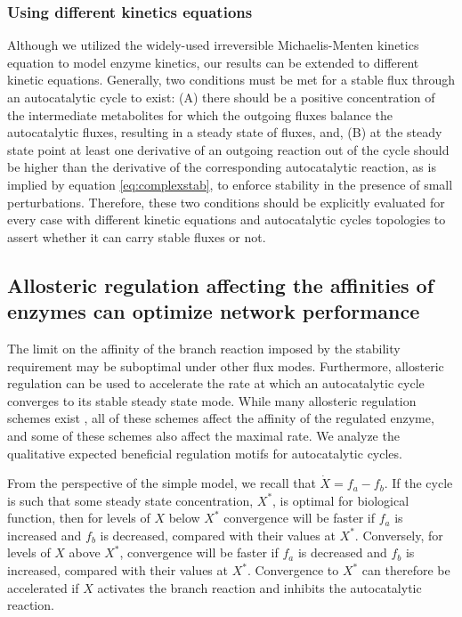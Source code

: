     \subsubsection{Using different kinetics equations}
    Although we utilized the widely-used irreversible Michaelis-Menten kinetics equation to model enzyme kinetics, our results can be extended to different kinetic equations.
    Generally, two conditions must be met for a stable flux through an autocatalytic cycle to exist: (A) there should be a positive concentration of the intermediate metabolites for which the outgoing fluxes balance the autocatalytic fluxes, resulting in a steady state of fluxes, and, (B) at the steady state point at least one derivative of an outgoing reaction out of the cycle should be higher than the derivative of the corresponding autocatalytic reaction, as is implied by equation \ref{eq:complexstab}, to enforce stability in the presence of small perturbations.
    Therefore, these two conditions should be explicitly evaluated for every case with different kinetic equations and autocatalytic cycles topologies to assert whether it can carry stable fluxes or not.


    \subsection{Allosteric regulation affecting the affinities of enzymes can optimize network performance}
    The limit on the affinity of the branch reaction imposed by the stability requirement may be suboptimal under other flux modes.
    Furthermore, allosteric regulation can be used to accelerate the rate at which an autocatalytic cycle converges to its stable steady state mode.
    While many allosteric regulation schemes exist \cite{Leskovac2003-li}, all of these schemes affect the affinity of the regulated enzyme, and some of these schemes also affect the maximal rate.
    We analyze the qualitative expected beneficial regulation motifs for autocatalytic cycles.

    From the perspective of the simple model, we recall that $\dot{X}=f_a-f_b$.
    If the cycle is such that some steady state concentration, $X^*$, is optimal for biological function, then for levels of $X$ below $X^*$ convergence will be faster if $f_a$ is increased and $f_b$ is decreased, compared with their values at $X^*$.
    Conversely, for levels of $X$ above $X^*$, convergence will be faster if $f_a$ is decreased and $f_b$ is increased, compared with their values at $X^*$.
    Convergence to $X^*$ can therefore be accelerated if $X$ activates the branch reaction and inhibits the autocatalytic reaction.

